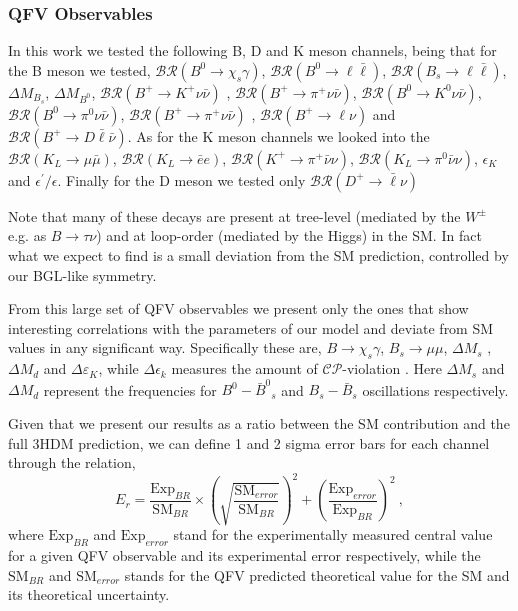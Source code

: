 \documentclass[10pt]{report}
\begin{document}
\subsubsection{QFV Observables}
%
In this work we tested the following B, D and K meson channels, being that for the B meson we tested, 
%
$\mathcal{BR} \left( B^0 \rightarrow \chi_s \gamma \right)$, 
$\mathcal{BR} \left( B^0 \rightarrow \ell \bar{\ell} \right)$, 
$\mathcal{BR} \left( B_s \rightarrow \ell \bar{\ell} \right)$, 
$\Delta M_{B_s}$, 
$\Delta M_{B^0}$, 
$\mathcal{BR} \left( B^+ \rightarrow K^+\nu\bar{\nu} \right)$ , 
$\mathcal{BR} \left( B^+ \rightarrow \pi^+\nu\bar{\nu} \right)$, 
$\mathcal{BR} \left( B^0 \rightarrow K^0\nu\bar{\nu} \right)$,  
$\mathcal{BR} \left( B^0 \rightarrow \pi^0 \nu\bar{\nu} \right)$, 
$\mathcal{BR} \left( B^+ \rightarrow \pi^+\nu\bar{\nu} \right)$ , 
$\mathcal{BR} \left( B^+ \rightarrow \ell \nu \right)$ and
$\mathcal{BR} \left( B^+ \rightarrow D \bar{\ell} \bar{\nu} \right)$. 
%
As for the K meson channels we looked into the $\mathcal{BR} \left( K_L \rightarrow \mu \bar{\mu} \right)$,  $\mathcal{BR} \left( K_L \rightarrow \bar{e} e \right)$,  $\mathcal{BR} \left( K^+ \rightarrow \pi^+ \bar{\nu} \nu \right)$, $\mathcal{BR} \left( K_L \rightarrow \pi^0 \bar{\nu} \nu \right)$, $\epsilon_K$ and $\epsilon^\prime/\epsilon$. 
%
Finally for the D meson we tested only $\mathcal{BR} ( D^+ \rightarrow \bar{\ell} \nu ) $

Note that many of these decays are present at tree-level (mediated by the $W^\pm$ e.g. as $B \rightarrow \tau \nu$) and at loop-order (mediated by the Higgs) in the SM. 
%
In fact what we expect to find is a small deviation from the SM prediction, controlled by our BGL-like symmetry. 

From this large set of QFV observables we present only the ones that show interesting correlations with the parameters of our model and deviate from SM values in any significant way.
%
Specifically these are, $B \rightarrow \chi_s \gamma$, $B_s \rightarrow \mu \mu$, $\Delta M_s$ , $\Delta M_d$ and $\Delta \varepsilon_K$, while $\Delta \epsilon_k$ measures the amount of $\mathcal{CP}$-violation . 
%
Here $\Delta M_s$ and $\Delta M_d$ represent the frequencies for ${B^0} - {\bar{B}^0}_s$ and ${B_s} - {\bar{B}_s}$ oscillations respectively. 

Given that we present our results as a ratio between the SM contribution and the full 3HDM prediction, we can define 1 and 2 sigma error bars for each channel through the relation, 
%
\begin{equation}
E_r = \frac{\text{Exp}_{BR}}{\text{SM}_{BR}} \times \left( \sqrt{\frac{\text{SM}_{error}}{\text{SM}_{BR}}}\right)^2 + \left( \frac{\text{Exp}_{error}}{\text{Exp}_{BR}} \right)^2 \ , 
\end{equation} 
%
where $\text{Exp}_{BR}$ and $\text{Exp}_{error}$ stand for the experimentally measured central value for a given QFV observable and its experimental error respectively, while the $\text{SM}_{BR}$ and $\text{SM}_{error}$ stands for the QFV predicted theoretical value for the SM and its theoretical uncertainty. 
\end{document}
